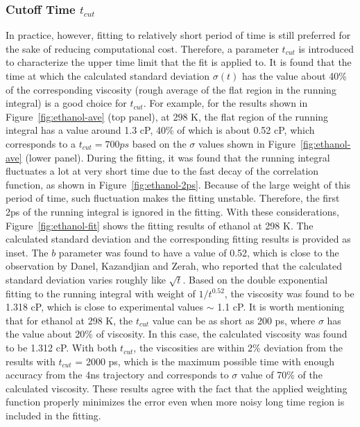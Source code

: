\documentclass[12pt]{article}
\begin{document}
\subsubsection{Cutoff Time $t_{cut}$}

In practice, however,
fitting to relatively short period of time is still preferred for the sake of reducing computational cost.
Therefore, a parameter $t_{cut}$ is introduced to characterize the upper time limit that the fit is applied to.
It is found that the time at which the calculated standard deviation $\sigma(t)$ has the value about 40\% of the corresponding viscosity
(rough average of the flat region in the running integral) is a good choice for $t_{cut}$.
For example, for the results shown in Figure~\ref{fig:ethanol-ave} (top panel),
at 298 K, the flat region of the running integral has a value around 1.3 cP,
40\% of which is about 0.52 cP,
which corresponds to a $t_{cut} = 700 ps$ based on the $\sigma$ values shown in Figure~\ref{fig:ethanol-ave} (lower panel).
During the fitting,
it was found that the running integral fluctuates a lot at very short time due to the fast decay of the correlation function,
as shown in Figure~\ref{fig:ethanol-2ps}.
Because of the large weight of this period of time,
such fluctuation makes the fitting unstable.
Therefore, the first 2ps of the running integral is ignored in the fitting.
With these considerations,
Figure~\ref{fig:ethanol-fit} shows the fitting results of ethanol at 298 K.
The calculated standard deviation and the corresponding fitting results is provided as inset.
The $b$ parameter was found to have a value of 0.52,
which is close to the observation by Danel, Kazandjian and Zerah,
\cite{Kazandjian.PRE.85.066701.2012}
who reported that the calculated standard deviation varies roughly like $\sqrt{t}$.
Based on the double exponential fitting to the running integral with weight of $1/t^{0.52}$,
the viscosity was found to be 1.318 cP,
which is close to experimental values $\sim$ 1.1 cP.
\cite{Jouyban.KJCE.29.812.2012,
Nain.JML.140.108.2008,
Bhuiyan.JML.138.139.2008,
Fonseca.JCED.52.1240.2007,
Taboas.JCED.51.940.2006,
Tojo.JCED.49.1590.2004}
It is worth mentioning that for ethanol at 298 K,
the $t_{cut}$ value can be as short as 200 ps,
where $\sigma$ has the value about 20\% of viscosity.
In this case, the calculated viscosity was found to be 1.312 cP.
With both $t_{cut}$, the viscosities are within 2\% deviation from the results with $t_{cut}$ = 2000 ps,
which is the maximum possible time with enough accuracy from the 4ns trajectory
and corresponds to $\sigma$ value of 70\% of the calculated viscosity.
These results agree with the fact that the applied weighting function properly
minimizes the error even when more noisy long time region is included in the fitting.
\end{document}

